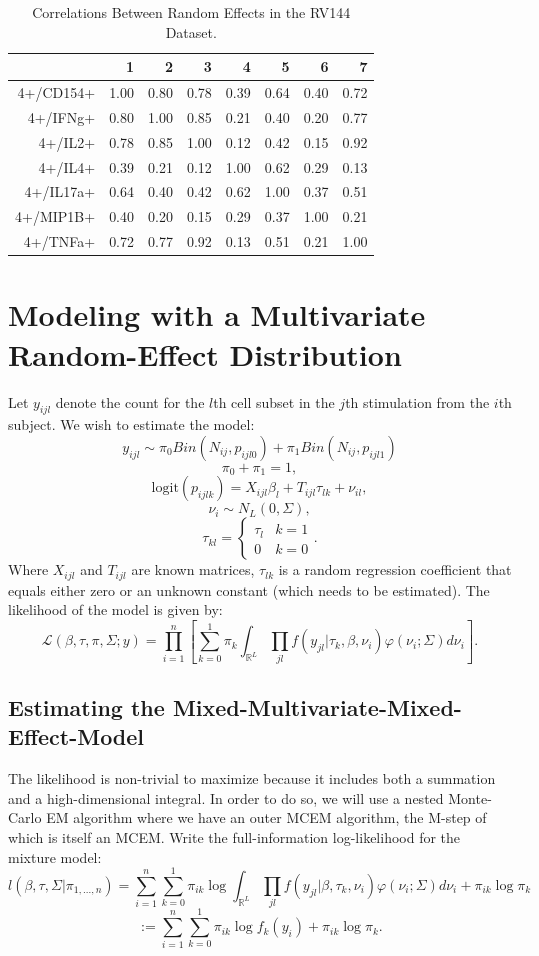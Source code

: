 \documentclass{article}\usepackage[]{graphicx}\usepackage[]{color}
\begin{document}
\begin{table}[ht]
\centering
\begin{tabular}{rrrrrrrr}
  \hline
 & 1 & 2 & 3 & 4 & 5 & 6 & 7 \\ 
  \hline
4+/CD154+ & 1.00 & 0.80 & 0.78 & 0.39 & 0.64 & 0.40 & 0.72 \\ 
  4+/IFNg+ & 0.80 & 1.00 & 0.85 & 0.21 & 0.40 & 0.20 & 0.77 \\ 
  4+/IL2+ & 0.78 & 0.85 & 1.00 & 0.12 & 0.42 & 0.15 & 0.92 \\ 
  4+/IL4+ & 0.39 & 0.21 & 0.12 & 1.00 & 0.62 & 0.29 & 0.13 \\ 
  4+/IL17a+ & 0.64 & 0.40 & 0.42 & 0.62 & 1.00 & 0.37 & 0.51 \\ 
  4+/MIP1B+ & 0.40 & 0.20 & 0.15 & 0.29 & 0.37 & 1.00 & 0.21 \\ 
  4+/TNFa+ & 0.72 & 0.77 & 0.92 & 0.13 & 0.51 & 0.21 & 1.00 \\ 
   \hline
\end{tabular}
\caption{Correlations Between Random Effects in the RV144 Dataset.}
\label{corTable}
\end{table}





\section{Modeling with a Multivariate Random-Effect Distribution}
Let $y_{ijl}$ denote the count for the $l$th cell subset in the $j$th stimulation from the $i$th subject. We wish to estimate the model:
$$
y_{ijl} \sim \pi_0 Bin(N_{ij}, p_{ijl0}) + \pi_1 Bin(N_{ij}, p_{ijl1})
$$$$
\pi_0 + \pi_1 = 1,
$$$$
\text{logit}(p_{ijlk}) = X_{ijl} \beta_l + T_{ijl}\tau_{lk} + \nu_{il},
$$$$
\nu_{i} \sim N_L(0, \Sigma),
$$$$
\tau_{kl} = \begin{cases}
\tau_l & k = 1 \\
0 & k = 0 
\end{cases}.
$$
Where $X_{ijl}$ and $T_{ijl}$ are known matrices, $\tau_{lk}$ is a random regression coefficient that equals either zero or an unknown constant (which needs to be estimated). The likelihood of the model is given by:
$$
\mathcal{L}(\beta,\tau, \pi, \Sigma; y) = \prod_{i=1}^{n}\left[
\sum_{k=0}^{1} \pi_k\int_{\mathbb{R}^{L}} \prod_{jl} f(y_{jl} |\tau_k, \beta, \nu_i) \varphi(\nu_i;\Sigma) d\nu_i
\right].
$$

\subsection{Estimating the Mixed-Multivariate-Mixed-Effect-Model}
The likelihood is non-trivial to maximize because it includes both a summation and a high-dimensional integral. In order to do so, we will use a nested Monte-Carlo EM algorithm where we have an outer MCEM algorithm, the M-step of which is itself an MCEM. Write the full-information log-likelihood for the mixture model:
$$
l(\beta, \tau, \Sigma | \pi_{1,...,n}) = \sum_{i=1}^{n} \sum_{k=0}^{1}\pi_{ik} \log \int_{\mathbb{R}^{L}} \prod_{jl} f(y_{jl} |\beta, \tau_k, \nu_i) \varphi(\nu_i;\Sigma)d\nu_i + \pi_{ik}\log \pi_k
$$$$
:=\sum_{i=1}^{n} \sum_{k=0}^{1}\pi_{ik} \log f_k(y_i) + \pi_{ik}\log \pi_k.
$$
\end{document}
